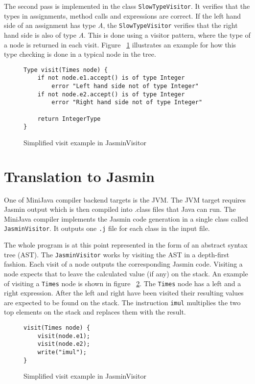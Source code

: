 \documentclass[11pt]{amsart}
\begin{document}
The second pass is implemented in the class \texttt{SlowTypeVisitor}. It verifies that the types in assignments, method calls and expressions are correct. If the left hand side of an assignment has type \textit{A}, the \texttt{SlowTypeVisitor} verifies that the right hand side is also of type \textit{A}. This is done using a visitor pattern, where the type of a node is returned in each visit. Figure ~\ref{fig:timestypecheck} illustrates an example for how this type checking is done in a typical node in the tree.

\begin{figure}[H]
\label{fig:timestypecheck}
\begin{verbatim}
Type visit(Times node) {
    if not node.e1.accept() is of type Integer
        error "Left hand side not of type Integer"
    if not node.e2.accept() is of type Integer
        error "Right hand side not of type Integer"

    return IntegerType
}
\end{verbatim}
\caption{Simplified visit example in JasminVisitor}
\end{figure}

\section{Translation to Jasmin}
One of MiniJava compiler backend targets is the JVM. The JVM target requires Jasmin\cite{jasmin} output which is then compiled into .class files that Java can run. The MiniJava compiler implements the Jasmin code generation in a single class called \texttt{JasminVisitor}. It outputs one \texttt{.j} file for each class in the input file.

The whole program is at this point represented in the form of an abstract syntax tree (AST). The \texttt{JasminVisitor} works by visiting the AST in a depth-first fashion. Each visit of a node outputs the corresponding Jasmin code. Visiting a node expects that to leave the calculated value (if any) on the stack. An example of visiting a \texttt{Times} node is shown in figure ~\ref{fig:timesexample}. The \texttt{Times} node has a left and a right expression. After the left and right have been visited their resulting values are expected to be found on the stack. The instruction \texttt{imul} multiplies the two top elements on the stack and replaces them with the result.

\begin{figure}[H]
\label{fig:timesexample}
\begin{verbatim}
visit(Times node) {
    visit(node.e1);
    visit(node.e2);
    write("imul");
}
\end{verbatim}
\caption{Simplified visit example in JasminVisitor}
\end{figure}
\end{document}
